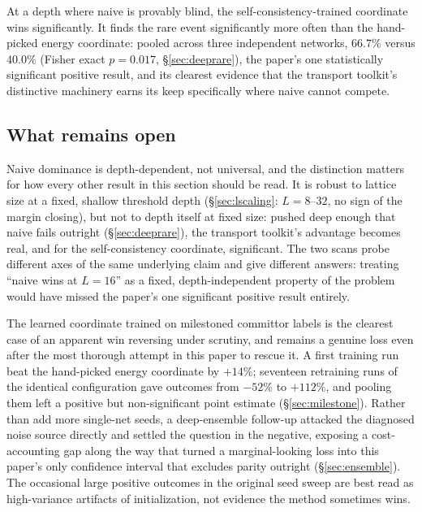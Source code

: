 \documentclass[11pt]{article}
\begin{document}
	At a depth where naive is provably blind, the self-consistency-trained
		coordinate wins significantly. It finds the rare event
	significantly more often than the hand-picked energy coordinate: pooled across three
	independent networks, $66.7\%$ versus $40.0\%$ (Fisher exact $p=0.017$,
	\S\ref{sec:deeprare}), the paper's one statistically significant positive result, and
	its clearest evidence that the transport toolkit's distinctive machinery earns its keep
	specifically where naive cannot compete.

	\subsection{What remains open}
	Naive dominance is depth-dependent, not universal, and the distinction matters for
		how every other result in this section should be read. It is robust to lattice size at a
	fixed, shallow threshold depth (\S\ref{sec:lscaling}: $L=8$--$32$, no sign of the margin
	closing), but not to depth itself at fixed size: pushed deep enough that naive fails
	outright (\S\ref{sec:deeprare}), the transport toolkit's advantage becomes real, and for the
	self-consistency coordinate, significant. The two scans probe different axes of the same
	underlying claim and give different answers: treating ``naive wins at $L=16$'' as a fixed,
	depth-independent property of the problem would have missed the paper's one significant
	positive result entirely.

	The learned coordinate trained on milestoned committor labels is the clearest case
		of an apparent win reversing under scrutiny, and remains a genuine loss even after the
	most thorough attempt in this paper to rescue it. A first training run beat the hand-picked
	energy coordinate by $+14\%$; seventeen retraining runs of the identical configuration gave
	outcomes from $-52\%$ to $+112\%$, and pooling them left a positive but non-significant
	point estimate (\S\ref{sec:milestone}). Rather than add more single-net seeds, a
	deep-ensemble follow-up attacked the diagnosed noise source directly and settled the
	question in the negative, exposing a cost-accounting gap along the way that turned a
	marginal-looking loss into this paper's only confidence interval that excludes parity
	outright (\S\ref{sec:ensemble}). The occasional large positive outcomes in the original
	seed sweep are best read as high-variance artifacts of initialization, not evidence the
	method sometimes wins.
\end{document}
